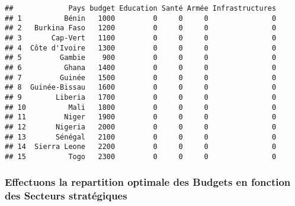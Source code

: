 \documentclass[
]{article}
\begin{document}
\begin{verbatim}
##             Pays budget Education Santé Armée Infrastructures
## 1          Bénin   1000         0     0     0               0
## 2   Burkina Faso   1200         0     0     0               0
## 3       Cap-Vert   1100         0     0     0               0
## 4  Côte d'Ivoire   1300         0     0     0               0
## 5         Gambie    900         0     0     0               0
## 6          Ghana   1400         0     0     0               0
## 7         Guinée   1500         0     0     0               0
## 8  Guinée-Bissau   1600         0     0     0               0
## 9        Liberia   1700         0     0     0               0
## 10          Mali   1800         0     0     0               0
## 11         Niger   1900         0     0     0               0
## 12       Nigeria   2000         0     0     0               0
## 13       Sénégal   2100         0     0     0               0
## 14  Sierra Leone   2200         0     0     0               0
## 15          Togo   2300         0     0     0               0
\end{verbatim}

\hypertarget{effectuons-la-repartition-optimale-des-budgets-en-fonction-des-secteurs-stratuxe9giques}{%
\subsubsection{Effectuons la repartition optimale des Budgets en
fonction des Secteurs
stratégiques}\label{effectuons-la-repartition-optimale-des-budgets-en-fonction-des-secteurs-stratuxe9giques}}
\end{document}
